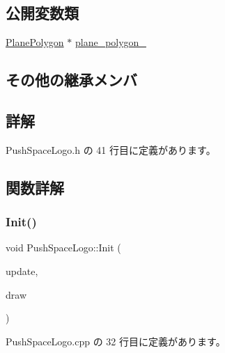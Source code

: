 \subsection*{公開変数類}
\begin{DoxyCompactItemize}
\item 
\mbox{\hyperlink{class_plane_polygon}{Plane\+Polygon}} $\ast$ \mbox{\hyperlink{class_push_space_logo_ab35a4cee269c3ba0b709a8951ccc3d42}{plane\+\_\+polygon\+\_\+}}
\end{DoxyCompactItemize}
\subsection*{その他の継承メンバ}


\subsection{詳解}


 Push\+Space\+Logo.\+h の 41 行目に定義があります。



\subsection{関数詳解}
\mbox{\label{class_push_space_logo_a381d34d0dfdd493eb46f299d2a2ba858}} 
\subsubsection{\texorpdfstring{Init()}{Init()}}
{\footnotesize\ttfamily void Push\+Space\+Logo\+::\+Init (\begin{DoxyParamCaption}\item[{\mbox{\hyperlink{class_update_base}{Update\+Base}} $\ast$}]{update,  }\item[{\mbox{\hyperlink{class_draw_base}{Draw\+Base}} $\ast$}]{draw }\end{DoxyParamCaption})}



 Push\+Space\+Logo.\+cpp の 32 行目に定義があります。

\mbox{\label{class_push_space_logo_afa163b1aff8df494b4f09f378bf983f0}} 
